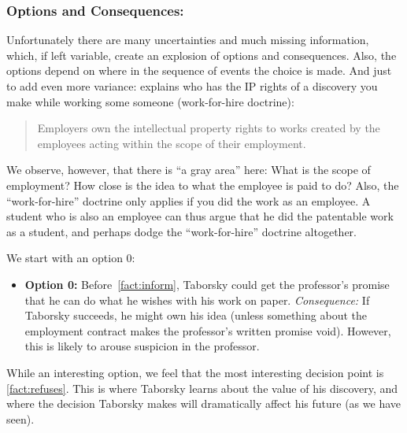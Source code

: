 \documentclass[draft,11pt,openright,monochrome,british,a4paper]{scrartcl}
\begin{document}
\subsubsection*{Options and Consequences:}
Unfortunately there are many uncertainties and much missing
information, which, if left variable, create an explosion of options
and consequences. Also, the options depend on where in the sequence of
events the choice is made. And just to add even more variance:
\cite{alger2001} explains who has the IP rights of a discovery you
make while working some someone (work-for-hire doctrine):
\begin{quote}
  Employers own the intellectual property rights to works created by
  the employees acting within the scope of their employment.
\end{quote}
We observe, however, that there is ``a gray area'' here: What is the
scope of employment? How close is the idea to what the employee is
paid to do? Also, the ``work-for-hire'' doctrine only applies if you
did the work as an employee. A student who is also an employee can
thus argue that he did the patentable work as a student, and perhaps
dodge the ``work-for-hire'' doctrine altogether.

We start with an option 0:
\begin{itemize}
\item \textbf{Option 0:} Before~\ref{fact:inform}, Taborsky could get
  the professor's promise that he can do what he wishes with his work
  on paper. \emph{Consequence:} If Taborsky succeeds, he might own his
  idea (unless something about the employment contract makes the
  professor's written promise void). However, this is likely to arouse
  suspicion in the professor.
\end{itemize}
While an interesting option, we feel that the most interesting
decision point is \ref{fact:refuses}. This is where Taborsky learns
about the value of his discovery, and where the decision Taborsky
makes will dramatically affect his future (as we have seen).
\end{document}
